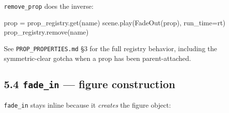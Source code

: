 \documentclass[
  11pt,
]{book}
\newenvironment{Shaded}{}{}
\newcommand{\NormalTok}[1]{#1}
\newcommand{\OperatorTok}[1]{\textcolor[rgb]{0.40,0.40,0.40}{#1}}
\begin{document}
\texttt{remove\_prop} does the inverse:

\begin{Shaded}
\begin{Highlighting}[]
\NormalTok{prop }\OperatorTok{=}\NormalTok{ prop\_registry.get(name)}
\NormalTok{scene.play(FadeOut(prop), run\_time}\OperatorTok{=}\NormalTok{rt)}
\NormalTok{prop\_registry.remove(name)}
\end{Highlighting}
\end{Shaded}

See \texttt{PROP\_PROPERTIES.md} §3 for the full registry behavior,
including the symmetric-clear gotcha when a prop has been
parent-attached.

\subsection{\texorpdfstring{5.4 \texttt{fade\_in} --- figure
construction}{5.4 fade\_in --- figure construction}}\label{fade_in-figure-construction}

\texttt{fade\_in} stays inline because it \emph{creates} the figure
object:
\end{document}
